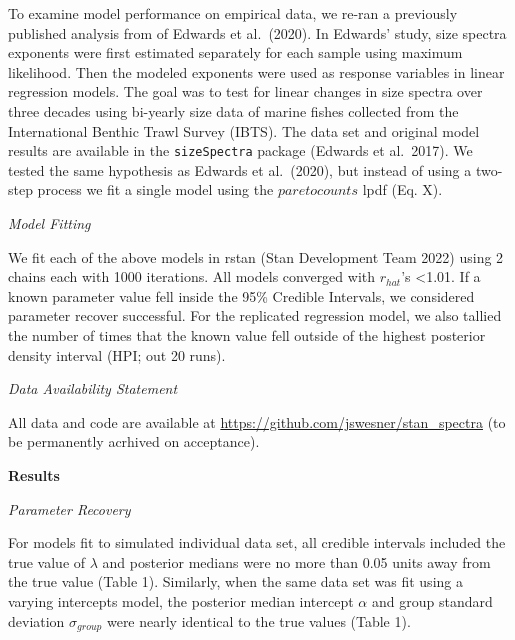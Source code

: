 \documentclass[
  12pt,
]{article}
\begin{document}
To examine model performance on empirical data, we re-ran a previously
published analysis from of Edwards et al.~(2020). In Edwards' study,
size spectra exponents were first estimated separately for each sample
using maximum likelihood. Then the modeled exponents were used as
response variables in linear regression models. The goal was to test for
linear changes in size spectra over three decades using bi-yearly size
data of marine fishes collected from the International Benthic Trawl
Survey (IBTS). The data set and original model results are available in
the \texttt{sizeSpectra} package (Edwards et al.~2017). We tested the
same hypothesis as Edwards et al.~(2020), but instead of using a
two-step process we fit a single model using the \(paretocounts\) lpdf
(Eq. X).

\emph{Model Fitting}

We fit each of the above models in rstan (Stan Development Team 2022)
using 2 chains each with 1000 iterations. All models converged with
\(r_{hat}\)'s \textless1.01. If a known parameter value fell inside the
95\% Credible Intervals, we considered parameter recover successful. For
the replicated regression model, we also tallied the number of times
that the known value fell outside of the highest posterior density
interval (HPI; out 20 runs).

\emph{Data Availability Statement}

All data and code are available at
\url{https://github.com/jswesner/stan_spectra} (to be permanently
acrhived on acceptance).

\textbf{Results}

\emph{Parameter Recovery}

For models fit to simulated individual data set, all credible intervals
included the true value of \(\lambda\) and posterior medians were no
more than 0.05 units away from the true value (Table 1). Similarly, when
the same data set was fit using a varying intercepts model, the
posterior median intercept \(\alpha\) and group standard deviation
\(\sigma_{group}\) were nearly identical to the true values (Table 1).
\end{document}
